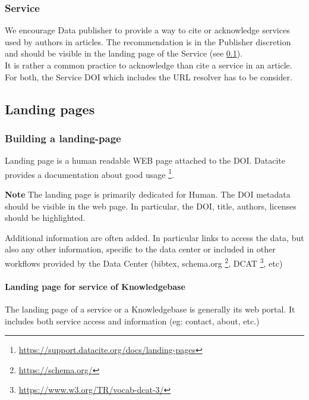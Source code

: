 \documentclass[11pt,a4paper]{ivoa}
\newcommand{\important}[1]{
	\begin{bigdescription}
		\item \color{ivoacolor}\textbf{Note} #1
	\end{bigdescription}
}
\begin{document}
\subsubsection{Service}
We encourage Data publisher to provide a way to cite or acknowledge services used by authors in articles. The recommendation is in the Publisher discretion and should be visible in the landing page of the Service (see \ref{sec:landingpage}).\\

It is rather a common practice to acknowledge than cite a service in an article. For both, the Service DOI which includes the URL resolver has to be consider.

\subsection{Landing pages}
\label{sec:landingpage}

\subsubsection{Building a landing-page}
Landing page is a human readable WEB page attached to the DOI. Datacite provides a documentation about good usage \footnote{\url{https://support.datacite.org/docs/landing-pages}}.

\important{
	The landing page is primarily dedicated for Human. 
	The DOI metadata should be visible in the web page. In particular, 
	the DOI, title, authors, licenses should be highlighted.
}



Additional information are often added. In particular links to access the data, but also any other information, specific to the data center or included in other workflows provided by the Data Center (bibtex, schema.org \footnote{\url{https://schema.org/}}, DCAT \footnote{\url{https://www.w3.org/TR/vocab-dcat-3/}}, etc)


\paragraph{Landing page for service of Knowledgebase}
The landing page of a service or a Knowledgebase is generally its web portal. It includes both service access and information (eg: contact, about, etc.)
\end{document}
